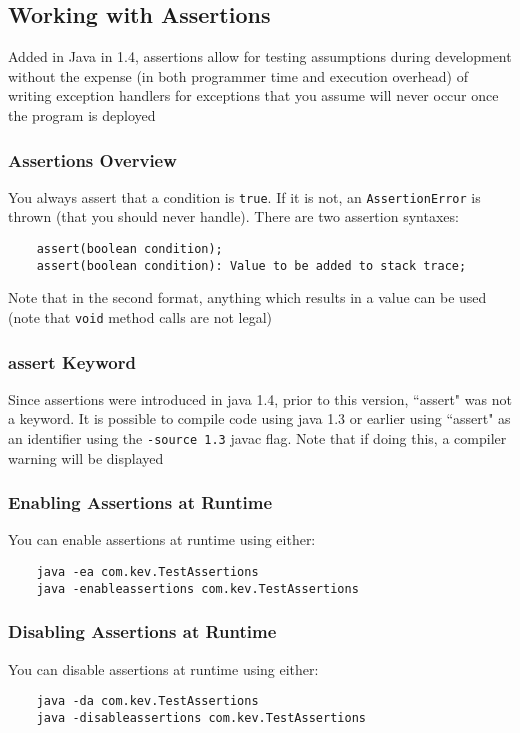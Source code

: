 \subsection{Working with Assertions}
Added in Java in 1.4, assertions allow for testing assumptions during 
development without the expense (in both programmer time and execution 
overhead) of writing exception handlers for exceptions that you assume will 
never occur once the program is deployed

\subsubsection{Assertions Overview}
You always assert that a condition is \verb#true#. If it is not, an 
\verb#AssertionError# is thrown (that you should never handle). There are two 
assertion syntaxes:
\begin{verbatim}
    assert(boolean condition);
    assert(boolean condition): Value to be added to stack trace;
\end{verbatim}
Note that in the second format, anything which results in a value can be used 
(note that \verb#void# method calls are not legal)

\subsubsection{assert Keyword}
Since assertions were introduced in java 1.4, prior to this version, ``assert" 
was not a keyword.  It is possible to compile code using java 1.3 or earlier 
using ``assert" as an identifier using the \verb#-source 1.3# javac flag. Note 
that if doing this, a compiler warning will be displayed

\subsubsection{Enabling Assertions at Runtime}
You can enable assertions at runtime using either:
\begin{verbatim}
    java -ea com.kev.TestAssertions
    java -enableassertions com.kev.TestAssertions
\end{verbatim}

\subsubsection{Disabling Assertions at Runtime}
You can disable assertions at runtime using either:
\begin{verbatim}
    java -da com.kev.TestAssertions
    java -disableassertions com.kev.TestAssertions
\end{verbatim}

